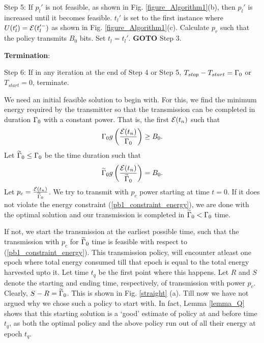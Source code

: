 Step 5: If $p_l'$ is not feasible, as shown in Fig. \ref{figure_Algorithm1}(b), then $p_l'$ is increased until it becomes feasible. $t_l'$ is set to the first instance where $U(t_l') = \mathcal{E}(t_l'^-)$ as shown in Fig. \ref{figure_Algorithm1}(c). Calculate $p_r$ such that the policy transmits $B_0$ bits. Set $t_l = t_l'$. \textbf{GOTO} Step 3.

\textbf{Termination}:

Step 6: If in any iteration at the end of Step 4 or Step 5, $T_{stop} - T_{start} = \Gamma_0$ or $T_{start} = 0$, terminate.


We need an initial feasible solution to begin with. For this, we find the minimum energy required by the transmitter so that the transmission can be completed in duration $\Gamma_0$ with a constant power. That is, the first $\mathcal{E}(t_n)$ such that
\begin{equation}
\Gamma_0 g\left(\frac{\mathcal{E}(t_n)}{\Gamma_0}\right)\geq B_0.
\end{equation}
Let $\widetilde{\Gamma}_0\le \Gamma_0$ be the time duration such that
\begin{equation}
\widetilde{\Gamma}_0 g\left(\frac{\mathcal{E}(t_n)}{\widetilde{\Gamma}_0}\right)=B_0.
\end{equation}
Let $p_c=\frac{\mathcal{E}(t_n)}{\widetilde{\Gamma}_0}$. We try to transmit with $p_c$ power starting at time $t=0$. If it does not violate the energy constraint (\ref{pb1_constraint_energy}), we are done with the optimal solution and our transmission is completed in $\widetilde{\Gamma}_0<\Gamma_0$ time.

If not, we start the transmission at the earliest possible time, such that the transmission with $p_c$ for $\widetilde{\Gamma}_0$ time is feasible with respect to (\ref{pb1_constraint_energy}). This transmission policy, will encounter atleast one epoch where total energy consumed till that epoch is equal to the total energy harvested upto it. Let time $t_q$ be the first point where this happens. Let $R$ and $S$ denote the starting and ending time, respectively, of transmission with power $p_c$. Clearly, $S-R=\widetilde{\Gamma}_0$. This is shown in Fig. \ref{straight} (a).  Till now we have not argued why we chose such a policy to start with. In fact, Lemma \ref{lemma_Q} shows that this starting solution is a `good' estimate of policy at and before time $t_q$, as both the optimal policy and the above policy run out of all their energy at epoch $t_q$. 

